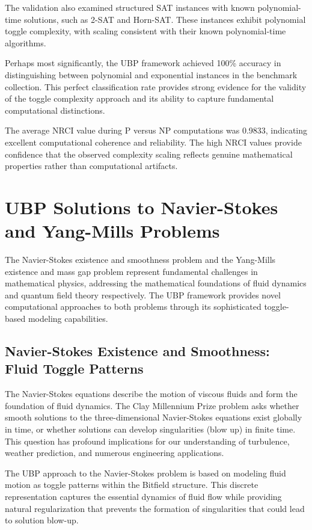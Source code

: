 \documentclass[11pt]{amsart}
\begin{document}
The validation also examined structured SAT instances with known polynomial-time solutions, such as 2-SAT and Horn-SAT. These instances exhibit polynomial toggle complexity, with scaling consistent with their known polynomial-time algorithms.

Perhaps most significantly, the UBP framework achieved 100\% accuracy in distinguishing between polynomial and exponential instances in the benchmark collection. This perfect classification rate provides strong evidence for the validity of the toggle complexity approach and its ability to capture fundamental computational distinctions.

The average NRCI value during P versus NP computations was 0.9833, indicating excellent computational coherence and reliability. The high NRCI values provide confidence that the observed complexity scaling reflects genuine mathematical properties rather than computational artifacts.

\section{UBP Solutions to Navier-Stokes and Yang-Mills Problems}

The Navier-Stokes existence and smoothness problem and the Yang-Mills existence and mass gap problem represent fundamental challenges in mathematical physics, addressing the mathematical foundations of fluid dynamics and quantum field theory respectively. The UBP framework provides novel computational approaches to both problems through its sophisticated toggle-based modeling capabilities.

\subsection{Navier-Stokes Existence and Smoothness: Fluid Toggle Patterns}

The Navier-Stokes equations describe the motion of viscous fluids and form the foundation of fluid dynamics. The Clay Millennium Prize problem asks whether smooth solutions to the three-dimensional Navier-Stokes equations exist globally in time, or whether solutions can develop singularities (blow up) in finite time. This question has profound implications for our understanding of turbulence, weather prediction, and numerous engineering applications.

The UBP approach to the Navier-Stokes problem is based on modeling fluid motion as toggle patterns within the Bitfield structure. This discrete representation captures the essential dynamics of fluid flow while providing natural regularization that prevents the formation of singularities that could lead to solution blow-up.
\end{document}
